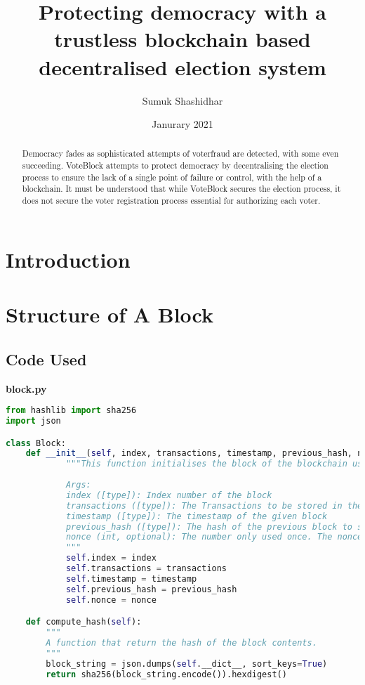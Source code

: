 \documentclass{article}
\title{Protecting democracy with a trustless blockchain based decentralised election system}
\author{Sumuk Shashidhar}
\date{Janurary 2021}
\begin{document}
	\maketitle
	\begin{abstract}
		Democracy fades as sophisticated attempts of voterfraud are detected, with some even succeeding. VoteBlock attempts to protect democracy by decentralising the election process to ensure the lack of a single point of failure or control, with the help of a blockchain. It must be understood that while VoteBlock secures the election process, it does not secure the voter registration process essential for authorizing each voter. 
	\end{abstract}
	\pagebreak
	\tableofcontents
	\pagebreak
	\section{Introduction}
	\section{Structure of A Block}
	\subsection{Code Used}
	\textbf{block.py}
	\begin{lstlisting}[language=Python]
from hashlib import sha256
import json

class Block:
	def __init__(self, index, transactions, timestamp, previous_hash, nonce=0):
			"""This function initialises the block of the blockchain using the regular concept
			
			Args:
			index ([type]): Index number of the block
			transactions ([type]): The Transactions to be stored in the given block
			timestamp ([type]): The timestamp of the given block
			previous_hash ([type]): The hash of the previous block to store
			nonce (int, optional): The number only used once. The nonce is to maintain uniqueness, making it hard to regenerate, which gives the blockchain the power it needs. Defaults to 0.
			"""
			self.index = index
			self.transactions = transactions
			self.timestamp = timestamp
			self.previous_hash = previous_hash
			self.nonce = nonce

	def compute_hash(self):
		"""
		A function that return the hash of the block contents.
		"""
		block_string = json.dumps(self.__dict__, sort_keys=True)
		return sha256(block_string.encode()).hexdigest()
	\end{lstlisting}
	
\end{document}
